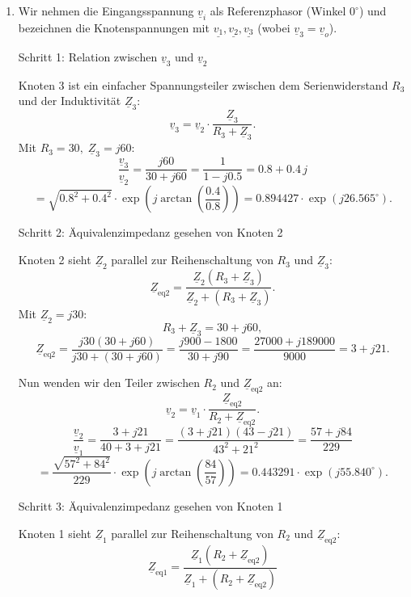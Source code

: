 \documentclass[11pt,a4paper]{article}
\newif\ifshowsolutions
\newenvironment{solution}
  {\ifshowsolutions
     \begin{tcolorbox}[enhanced, breakable, width=\textwidth,
       colback=green!5!white,colframe=green!50!black,
       fonttitle=\bfseries\large,
       title=Lösung]}
  {\end{tcolorbox}\fi}
\begin{document}
\ifshowsolutions
\begin{solution}
\begin{enumerate}[label=\alph*)]
\item Wir nehmen die Eingangsspannung \(\underline{v}_i\) als Referenzphasor (Winkel \(0^\circ\)) und bezeichnen die Knotenspannungen mit \(\underline{v_1}, \underline{v_2}, \underline{v_3}\) (wobei \(\underline{v}_3 = \underline{v}_o\)).

Schritt 1: Relation zwischen \(\underline{v}_3\) und \(\underline{v}_2\)

Knoten 3 ist ein einfacher Spannungsteiler zwischen dem Serienwiderstand \(R_3\) und der Induktivität \(\underline{Z}_3\):
\[
\underline{v}_3 = \underline{v}_2 \cdot \frac{\underline{Z}_3}{R_3 + \underline{Z}_3}.
\]
Mit \(R_3 = 30,\; \underline{Z}_3 = j60\):
\[
\frac{\underline{v}_3}{\underline{v}_2} = \frac{j60}{30 + j60} = \frac{1}{1 - j 0.5} = 0.8 + 0.4\,j
\]
\[
= \sqrt{0.8^2 + 0.4^2} \cdot \exp\!\left(j \arctan\!\left(\frac{0.4}{0.8}\right)\right) = 0.894427 \cdot \exp(j 26.565^\circ).
\]

Schritt 2: Äquivalenzimpedanz gesehen von Knoten 2

Knoten 2 sieht \(\underline{Z}_2\) parallel zur Reihenschaltung von \(R_3\) und \(\underline{Z}_3\):
\[
\underline{Z}_{\text{eq2}} = \frac{\underline{Z}_2 (R_3 + \underline{Z}_3)}{\underline{Z}_2 + (R_3 + \underline{Z}_3)}.
\]
Mit \(\underline{Z}_2 = j30\):
\[
R_3 + \underline{Z}_3 = 30 + j60,
\]
\[
\underline{Z}_{\text{eq2}} = \frac{j30 (30 + j60)}{j30 + (30 + j60)} = \frac{j900 - 1800}{30 + j90} = \frac{27000 + j189000}{9000} = 3 + j21.
\]

Nun wenden wir den Teiler zwischen \(R_2\) und \(\underline{Z}_{\text{eq2}}\) an:
\[
\underline{v}_2 = \underline{v}_1 \cdot \frac{\underline{Z}_{\text{eq2}}}{R_2 + \underline{Z}_{\text{eq2}}}.
\]
\[
\frac{\underline{v}_2}{\underline{v}_1} = \frac{3 + j21}{40 + 3 + j21} = \frac{(3 + j21) (43 - j21)}{43^2 + 21^2} = \frac{57 + j84}{229}
\]
\[
= \frac{\sqrt{57^2 + 84^2}}{229} \cdot \exp\!\left(j \arctan\!\left(\frac{84}{57}\right)\right) = 0.443291 \cdot \exp\!\left(j 55.840^\circ\right).
\]

Schritt 3: Äquivalenzimpedanz gesehen von Knoten 1

Knoten 1 sieht \(\underline{Z}_1\) parallel zur Reihenschaltung von \(R_2\) und \(\underline{Z}_{\text{eq2}}\):
\[
\underline{Z}_{\text{eq1}} = \frac{\underline{Z}_1 (R_2 + \underline{Z}_{\text{eq2}})}{\underline{Z}_1 + (R_2 + \underline{Z}_{\text{eq2}})}
\]


\end{enumerate}
\end{solution}
\end{document}
